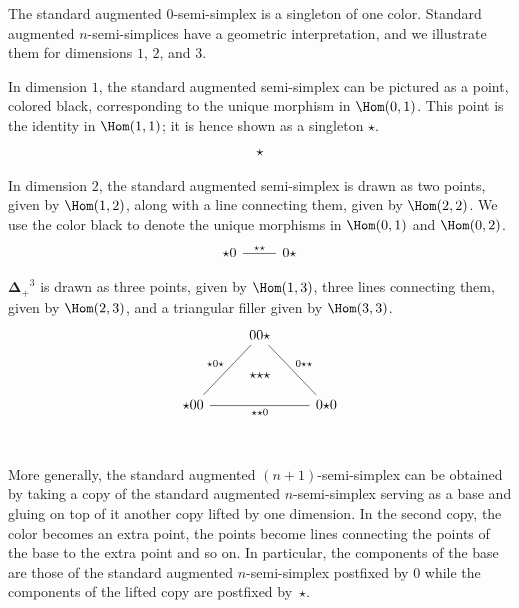\documentclass[10pt]{art.cls/art}
\newcommand{\DeltaPlus}{\ensuremath{\boldsymbol{\Delta}_+}}
\newcommand{\kstar}{{\star}}
\begin{document}
The standard augmented $0$-semi-simplex is a singleton of one color. Standard augmented $n$-semi-simplices have a geometric interpretation, and we illustrate them for dimensions $1$, $2$, and $3$.

\begin{example}[$\DeltaPlus^1$]
  In dimension $1$, the standard augmented semi-simplex can be pictured as a point, colored black, corresponding to the unique morphism in $\Hom(0, 1)$. This point is the identity in $\Hom(1, 1)$; it is hence shown as a singleton $\kstar$.
  \begin{equation*}
    \begin{tikzcd}
      \kstar
    \end{tikzcd}
  \end{equation*}
\end{example}

\begin{example}[$\DeltaPlus^2$]
  In dimension $2$, the standard augmented semi-simplex is drawn as two points, given by $\Hom(1, 2)$, along with a line connecting them, given by $\Hom(2, 2)$. We use the color black to denote the unique morphisms in $\Hom(0, 1)$ and $\Hom(0, 2)$.
  \begin{equation*}
    \begin{tikzcd}
      \kstar0 \arrow[r, dash, "\kstar\kstar"] & 0\kstar
    \end{tikzcd}
  \end{equation*}
\end{example}

\begin{example}[$\DeltaPlus^3$]
  $\DeltaPlus^3$ is drawn as three points, given by $\Hom(1, 3)$, three lines connecting them, given by $\Hom(2, 3)$, and a triangular filler given by $\Hom(3, 3)$.
  \begin{equation*}
    \begin{tikzcd}
      & |[alias=F]|00\kstar \arrow[ddr, dash, "0\kstar\kstar"] & \\\\
      \kstar00 \arrow[rr, dash, "\kstar\kstar0"{name=T, below}]\arrow[uur, dash, "\kstar0\kstar"] && 0\kstar0 \\
      \arrow[rightarrow, from=F, to=T, phantom, "\kstar\kstar\kstar" description]
    \end{tikzcd}
  \end{equation*}
\end{example}

More generally, the standard augmented $(n + 1)$-semi-simplex can be obtained by taking a copy of the standard augmented $n$-semi-simplex serving as a base and gluing on top of it another copy lifted by one dimension. In the second copy, the color becomes an extra point, the points become lines connecting the points of the base to the extra point and so on. In particular, the components of the base are those of the standard augmented $n$-semi-simplex postfixed by $0$ while the components of the lifted copy are postfixed by~$\kstar$.
\end{document}
